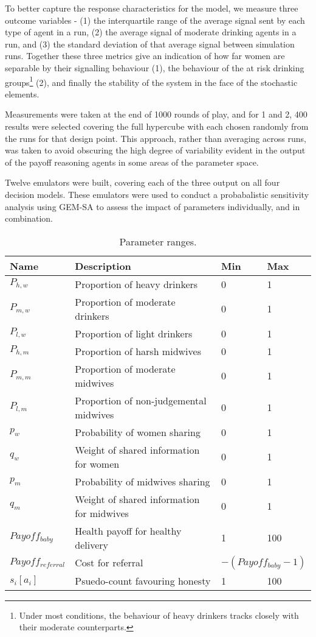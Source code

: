 To better capture the response characteristics for the model, we measure three outcome variables - (1) the interquartile range of the average signal sent by each type of agent in a run, (2) the average signal of moderate drinking agents in a run, and (3) the standard deviation of that average signal between simulation runs. Together these three metrics give an indication of how far women are separable by their signalling behaviour (1), the behaviour of the at risk drinking groups\footnote{Under most conditions, the behaviour of heavy drinkers tracks closely with their moderate counterparts.} (2), and finally the stability of the system in the face of the stochastic elements.

Measurements were taken at the end of 1000 rounds of play, and for 1 and 2, 400 results were selected covering the full hypercube with each chosen randomly from the runs for that design point. This approach, rather than averaging across runs, was taken to avoid obscuring the high degree of variability evident in the output of the payoff reasoning agents in some areas of the parameter space.

Twelve emulators were built, covering each of the three output on all four decision models. These emulators were used to conduct a probabalistic sensitivity analysis using \ac{GEM-SA} to assess the impact of parameters individually, and in combination.

\begin{table}
\center
\begin{tabular} {|l | l | l| l|}
\hline
Name & Description & Min & Max \\ \hline
\(P_{h,w}\) & Proportion of heavy drinkers & 0 & 1 \\ \hline
\(P_{m,w}\) & Proportion of moderate drinkers & 0 & 1 \\ \hline
\(P_{l,w}\) & Proportion of light drinkers & 0 & 1 \\ \hline
\(P_{h,m}\) & Proportion of harsh midwives & 0 & 1 \\ \hline
\(P_{m,m}\) & Proportion of moderate midwives & 0 & 1 \\ \hline
\(P_{l,m}\) & Proportion of non-judgemental midwives & 0 & 1 \\ \hline
\(p_{w}\) & Probability of women sharing & 0 & 1 \\ \hline
\(q_{w}\) & Weight of shared information for women & 0 & 1 \\ \hline
\(p_{m}\) & Probability of midwives sharing & 0 & 1 \\ \hline
\(q_{m}\) & Weight of shared information for midwives & 0 & 1 \\ \hline
\(Payoff_{baby}\) & Health payoff for healthy delivery & 1 & 100 \\ \hline
\(Payoff_{referral}\) & Cost for referral & \multicolumn{2}{l|}{\(-(Payoff_{baby} - 1)\)} \\ \hline
\(s_{i}[a_{i}]\) & Psuedo-count favouring honesty & 1 & 100 \\ \hline
\end{tabular}
\caption[Table caption text]{Parameter ranges. \label{tab:sa_params}}
\end{table}

